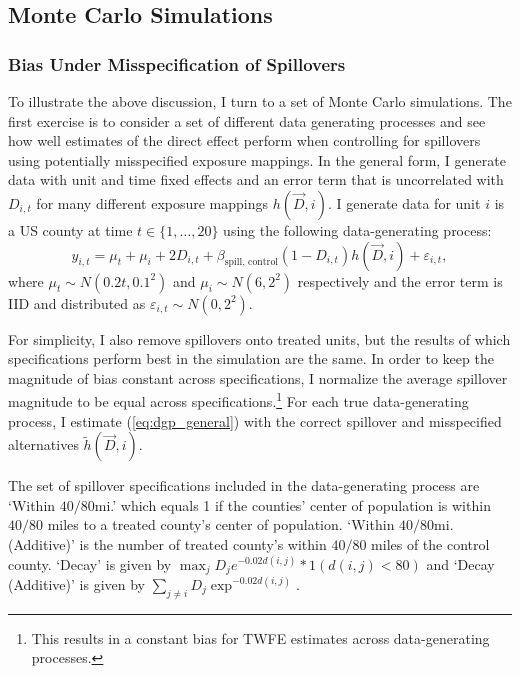 \documentclass[11pt]{article}
\begin{document}
\subsection{Monte Carlo Simulations}

\subsubsection{Bias Under Misspecification of Spillovers}

To illustrate the above discussion, I turn to a set of Monte Carlo simulations. The first exercise is to consider a set of different data generating processes and see how well estimates of the direct effect perform when controlling for spillovers using potentially misspecified exposure mappings. In the general form, I generate data with unit and time fixed effects and an error term that is uncorrelated with $D_{i,t}$ for many different exposure mappings $h(\vec{D}, i)$. I generate data for unit $i$ is a US county at time $t \in \{1, \dots, 20\}$ using the following data-generating process:
\begin{equation}\label{eq:dgp_general}
    y_{i,t} = \mu_t + \mu_i + 2 D_{i,t} + \beta_{\text{spill, control}} (1-D_{i,t}) h(\vec{D}, i) + \varepsilon_{i,t},
\end{equation}
where $\mu_t \sim N(0.2t, 0.1^2)$ and $\mu_i \sim N(6, 2^2)$ respectively and the error term is IID and distributed as $\varepsilon_{i,t} \sim N(0, 2^2)$. 

For simplicity, I also remove spillovers onto treated units, but the results of which specifications perform best in the simulation are the same. In order to keep the magnitude of bias constant across specifications, I normalize the average spillover magnitude to be equal across specifications.\footnote{This results in a constant bias for TWFE estimates across data-generating processes.} For each true data-generating process, I estimate (\ref{eq:dgp_general}) with the correct spillover and misspecified alternatives $\tilde{h}(\vec{D}, i)$. 

The set of spillover specifications included in the data-generating process are `Within $40/80$mi.' which equals 1 if the counties' center of population is within $40/80$ miles to a treated county's center of population. `Within $40/80$mi. (Additive)' is the number of treated county's within $40/80$ miles of the control county. `Decay' is given by $\max_j D_j e^{-0.02 d(i,j)} * 1(d(i,j) < 80)$ and `Decay (Additive)' is given by $\sum_{j \neq i} D_j \exp^{-0.02 d(i,j)}$.
\end{document}
